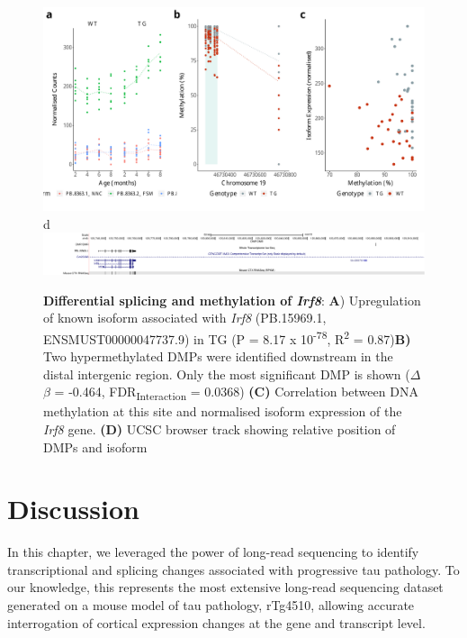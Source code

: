 \begin{figure}[]
	\includegraphics[page=5,scale = 0.4]{Figures/WholeDifferentialAnalysis_DMPDMR.pdf}
	\\
	\hspace*{0.2cm}\vspace{0.5cm}\large d
	\\
	\includegraphics[page=1,trim={1.5cm 0 0 0},scale = 0.9]{Figures/IRF8_DMP.pdf}
	\captionsetup{width=0.95\textwidth}
	\caption[Differential splicing and methylation of \textit{Irf8}]%
	{\textbf{Differential splicing and methylation of \textit{Irf8}}: \textbf{A}) Upregulation of known isoform associated with \textit{Irf8} (PB.15969.1, ENSMUST00000047737.9) in TG (P = 8.17 x 10\textsuperscript{-78}, R\textsuperscript{2} = 0.87)\textbf{B)} Two hypermethylated DMPs were identified downstream in the distal intergenic region. Only the most significant DMP is shown ($\Delta$$\beta$ = -0.464, FDR\textsubscript{Interaction} = 0.0368) \textbf{(C)} Correlation between DNA methylation at this site and normalised isoform expression of the \textit{Irf8} gene. \textbf{(D)} UCSC browser track showing relative position of DMPs and isoform}    
	\label{fig:IntMeth_Irf8}
\end{figure}



\clearpage
\section{Discussion}

In this chapter, we leveraged the power of long-read sequencing to identify transcriptional and splicing changes associated with progressive tau pathology. To our knowledge, this represents the most extensive long-read sequencing dataset generated on a mouse model of tau pathology, rTg4510, allowing accurate interrogation of cortical expression changes at the gene and transcript level. 

